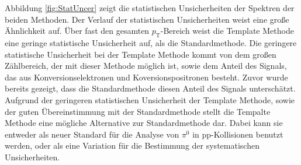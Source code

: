 \newline
Abbildung \ref{fig:StatUncer} zeigt die statistischen Unsicherheiten der Spektren der beiden Methoden.
Der Verlauf der statistischen Unsicherheiten weist eine große Ähnlichkeit auf.
Über fast den gesamten $p_\text{T}$-Bereich weist die Template Methode eine geringe statistische Unsicherheit auf, als die Standardmethode.
Die geringere statistische Unsicherheit bei der Template Methode kommt von dem großen Zählbereich, der mit  dieser Methode möglich ist, sowie dem Anteil des Signals, das aus Konversionselektronen und Koversionspositronen besteht.
Zuvor wurde bereits gezeigt, dass die Standardmethode diesen Anteil des Signals unterschätzt.
\newline
Aufgrund der geringeren statistischen Unsicherheit der Template Methode, sowie der guten Über\-ein\-stim\-mung mit der Standardmethode stellt die Tempalte Methode eine mögliche Alternative zur Standardmethode dar.
Dabei kann sie entweder als neuer Standard für die Analyse von $\pi^{0}$ in pp-Kollisionen benutzt werden, oder als eine Variation für die Bestimmung der systematischen Unsicherheiten.
